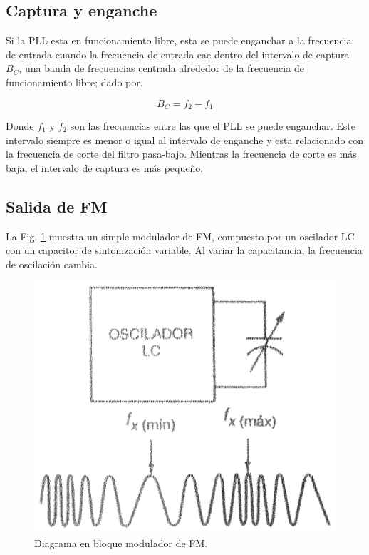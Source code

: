 \documentclass[10pt,a4paper]{IEEEtran}
\begin{document}
    \subsection{Captura y enganche}
    Si la PLL esta en funcionamiento libre, esta se 
    puede enganchar a la frecuencia de entrada cuando la frecuencia de entrada cae dentro del intervalo de captura $B_C$, una banda de frecuencias centrada alrededor de la frecuencia de funcionamiento libre; dado por.
    
    \begin{equation}\label{bc}
    B_C = f_{2}-f_{1} 
    \end{equation}
    
    Donde $f_{1}$ y $f_{2}$ son las frecuencias entre las que el PLL se puede enganchar. Este intervalo siempre es menor o igual al intervalo de enganche y esta relacionado con la frecuencia de corte del filtro pasa-bajo. Mientras la frecuencia de corte es más baja, el intervalo de captura es más pequeño.
    
    \subsection{Salida de FM}
    La Fig. \ref{sal} muestra un simple modulador de FM, compuesto por un oscilador LC con un capacitor de sintonización variable. Al variar la capacitancia, la frecuencia de oscilación cambia.
    
    \begin{figure}[H]
        \centering
        \includegraphics[scale=0.3]{sal.png}
        \caption{Diagrama en bloque modulador de FM.}
        \label{sal}
    \end{figure}
    
\end{document}
